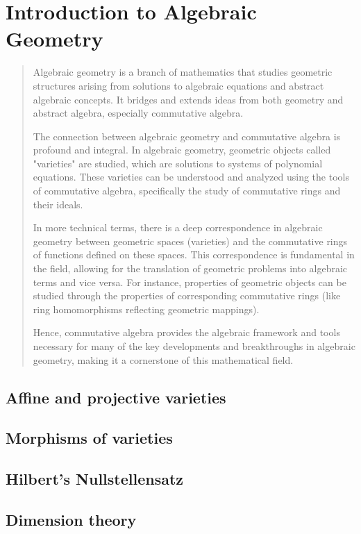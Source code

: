 \documentclass{article}
\begin{document}
\section{Introduction to Algebraic Geometry}
\begin{abstract}
	Algebraic geometry is a branch of mathematics that studies geometric structures arising from solutions to algebraic equations and abstract algebraic concepts. It bridges and extends ideas from both geometry and abstract algebra, especially commutative algebra.

The connection between algebraic geometry and commutative algebra is profound and integral. In algebraic geometry, geometric objects called "varieties" are studied, which are solutions to systems of polynomial equations. These varieties can be understood and analyzed using the tools of commutative algebra, specifically the study of commutative rings and their ideals. 

In more technical terms, there is a deep correspondence in algebraic geometry between geometric spaces (varieties) and the commutative rings of functions defined on these spaces. This correspondence is fundamental in the field, allowing for the translation of geometric problems into algebraic terms and vice versa. For instance, properties of geometric objects can be studied through the properties of corresponding commutative rings (like ring homomorphisms reflecting geometric mappings). 

Hence, commutative algebra provides the algebraic framework and tools necessary for many of the key developments and breakthroughs in algebraic geometry, making it a cornerstone of this mathematical field.
\end{abstract}

\subsection{Affine and projective varieties}
\subsection{Morphisms of varieties}
\subsection{Hilbert's Nullstellensatz}
\subsection{Dimension theory}
\end{document}
